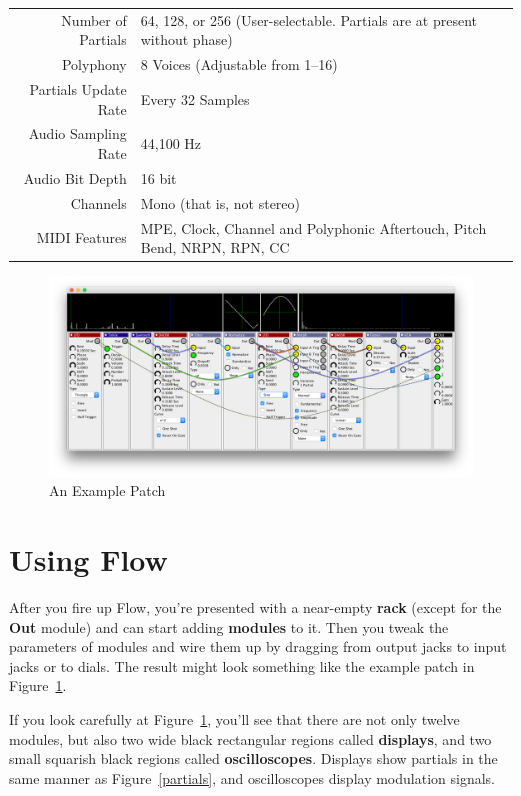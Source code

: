\documentclass{article}
\newcommand\bump{\vspace{20in}}
\newcommand\name{Flow}
\begin{document}
\begin{center}
\begin{tabular}{rl}
Number of Partials&64, 128, or 256 (User-selectable.  Partials are at present without phase)\\
Polyphony&8 Voices (Adjustable from 1--16)\\
Partials Update Rate&Every 32 Samples\\
Audio Sampling Rate&44,100 Hz\\
Audio Bit Depth&16 bit\\
Channels&Mono (that is, not stereo)\\
MIDI Features&MPE, Clock, Channel and Polyphonic Aftertouch, Pitch Bend, NRPN, RPN, CC\\
\end{tabular}
\end{center}


\begin{figure}[t]
\begin{center}\includegraphics[width=6.5in]{screenshot}\end{center}
\vspace{-3em}
\caption{An Example Patch}
\label{screenshot}
\end{figure}


\bump
\section{Using {\name}}

After you fire up {\name}, you're presented with a near-empty {\bf rack} (except for the {\bf Out} module) and can start adding {\bf modules} to it.  Then you tweak the parameters of modules and wire them up by dragging from output jacks to input jacks or to dials.  The result might look something like the example patch in Figure~\ref{screenshot}.

If you look carefully at Figure~\ref{screenshot}, you'll see that there are not only twelve modules, but also two wide black rectangular regions called {\bf displays}, and two small squarish black regions called {\bf oscilloscopes}.  Displays show partials in the same manner as Figure~\ref{partials}, and oscilloscopes display modulation signals.
\end{document}
